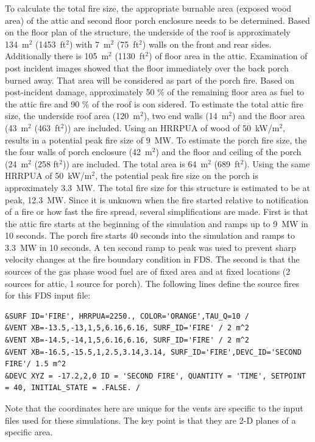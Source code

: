 \documentclass[11pt,oneside]{book}
\begin{document}
To calculate the total fire size, the appropriate burnable area (exposed wood area) of the attic and second floor porch enclosure needs to be determined. Based on the floor plan of the structure, the underside of the roof is approximately 134~m$^2$ (1453~ft$^2$) with 7~m$^2$ (75~ft$^2$) walls on the front and rear sides. Additionally there is 105~m$^2$ (1130~ft$^2$) of floor area in the attic. Examination of post incident images showed that the floor immediately over the back porch burned away. That area will be considered as part of the porch fire. Based on post-incident damage, approximately 50 \% of the remaining floor area as fuel to the attic fire and 90 \% of the roof is con sidered. To estimate the total attic fire size, the underside roof area (120~m$^2$), two end walls (14~m$^2$) and the floor area (43~m$^2$ (463~ft$^2$)) are included. Using an HRRPUA of wood of 50~kW/m$^2$, results in a potential peak fire size of 9~MW. To estimate the porch fire size, the the four walls of porch enclosure (42~m$^2$) and the floor and ceiling of the porch (24~m$^2$ (258 ft$^2$)) are included. The total area is 64~m$^2$ (689~ft$^2$). Using the same HRRPUA of 50~kW/m$^2$, the potential peak fire size on the porch is approximately 3.3~MW. The total fire size for this structure is estimated to be at peak, 12.3~MW. Since it is unknown when the fire started relative to notification of a fire or how fast the fire spread, several simplifications are made. First is that the attic fire starts at the beginning of the simulation and ramps up to 9~MW in 10 seconds. The porch fire starts 40 seconds into the simulation and ramps to 3.3~MW in 10 seconds. A ten second ramp to peak was used to prevent sharp velocity changes at the fire boundary condition in FDS. The second is that the sources of the gas phase wood fuel are of fixed area and at fixed locations (2 sources for attic, 1 source for porch). The following lines define the source fires for this FDS input file:

\begin{lstlisting}
&SURF ID='FIRE', HRRPUA=2250., COLOR='ORANGE',TAU_Q=10 /
&VENT XB=-13.5,-13,1,5,6.16,6.16, SURF_ID='FIRE' / 2 m^2
&VENT XB=-14.5,-14,1,5,6.16,6.16, SURF_ID='FIRE' / 2 m^2
&VENT XB=-16.5,-15.5,1,2.5,3.14,3.14, SURF_ID='FIRE',DEVC_ID='SECOND FIRE'/ 1.5 m^2
&DEVC XYZ = -17.2,2,0 ID = 'SECOND FIRE', QUANTITY = 'TIME', SETPOINT = 40, INITIAL_STATE = .FALSE. /
\end{lstlisting}
Note that the coordinates here are unique for the vents are specific to the input files used for these simulations. The key point is that they are 2-D planes of a specific area.
\end{document}
